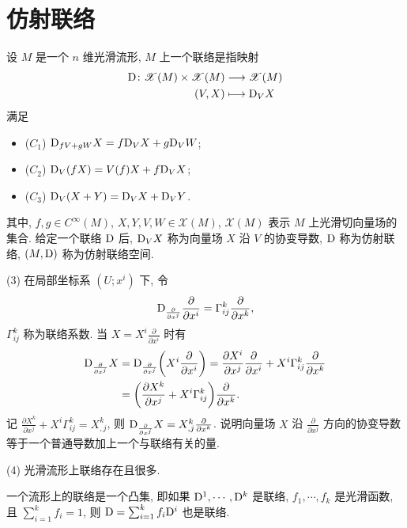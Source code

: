 \section{仿射联络}



\begin{definition}
  设 $M$ 是一个 $n$ 维光滑流形, $M$ 上一个联络是指映射
  \begin{align*}
    \mathrm{D}\colon \mathscr{X}(M)\times\mathscr{X}(M) & \longrightarrow\mathscr{X}(M) \\
    (V,X) & \longmapsto \mathrm{D}_V X
  \end{align*}
  满足
  \begin{itemize}
    \item ($C_1$) $\mathrm{D}_{fV+gW}X = f\mathrm{D}_V X+g\mathrm{D}_V W$;
    \item ($C_2$) $\mathrm{D}_V (fX) = V(f)X+f\mathrm{D}_V X$;
    \item ($C_3$) $\mathrm{D}_V (X+Y) = \mathrm{D}_V X+\mathrm{D}_V Y$.
  \end{itemize}
  其中, $f,g\in C^{\infty}(M)$, $X,Y,V,W\in\mathscr{X}(M)$,
  $\mathscr{X}(M)$ 表示 $M$ 上光滑切向量场的集合.
  给定一个联络 $\mathrm{D}$ 后, $\mathrm{D}_V X$ 称为向量场 $X$ 沿 $V$ 的协变导数,
  $\mathrm{D}$ 称为仿射联络, $(M,\mathrm{D})$ 称为仿射联络空间.
\end{definition}


\begin{remark}
  (3) 在局部坐标系 $(U;x^i)$ 下, 令
  \[\mathrm{D}_{\frac{\partial}{\partial x^j}}\frac{\partial}{\partial x^i}
     = \Gamma_{ij}^k \frac{\partial}{\partial x^k},\]
  $\Gamma_{ij}^k$ 称为联络系数. 当 $X=X^i\frac{\partial}{\partial x^i}$ 时有
  \begin{align*}
    \mathrm{D}_{\frac{\partial}{\partial x^j}} X
    & = \mathrm{D}_{\frac{\partial}{\partial x^j}}\biggl(X^i\frac{\partial}{\partial x^i}\biggr) 
      = \frac{\partial X^i}{\partial x^j}\frac{\partial}{\partial x^i}
        + X^i\Gamma_{ij}^k \frac{\partial}{\partial x^k} \\
    & = \biggl(\frac{\partial X^k}{\partial x^j} + X^i\Gamma_{ij}^k\biggr)\frac{\partial}{\partial x^k}.
  \end{align*}
  记 $\frac{\partial X^k}{\partial x^j}+X^i\Gamma_{ij}^k = X^k_{,j}$,
  则 $\mathrm{D}_{\frac{\partial}{\partial x^j}}X = X^k_{,j}\frac{\partial}{\partial x^k}$.
  说明向量场 $X$ 沿 $\frac{\partial}{\partial x^j}$ 方向的协变导数等于一个普通导数加上一个与联络有关的量.

  (4) 光滑流形上联络存在且很多.
  \begin{lemma}
    一个流形上的联络是一个凸集, 即如果 $\mathrm{D}^1,\cdots,\mathrm{D}^k$ 是联络, $f_1,\cdots,f_k$
    是光滑函数, 且 $\sum_{i=1}^k f_i=1$, 则 $\mathrm{D} = \sum_{i=1}^k f_i\mathrm{D}^i$ 也是联络.
  \end{lemma}
\end{remark}



